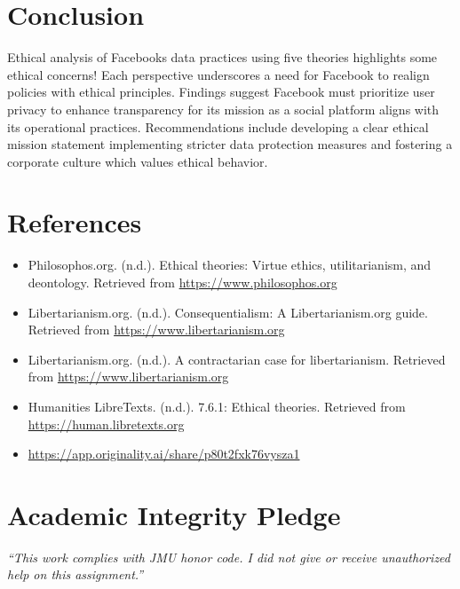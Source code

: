 \documentclass[12pt]{article}
\begin{document}
\section{Conclusion}
Ethical analysis of Facebooks data practices using five theories highlights some ethical concerns! Each perspective underscores a need for Facebook to realign policies with ethical principles. Findings suggest Facebook must prioritize user privacy to enhance transparency for its mission as a social platform aligns with its operational practices. Recommendations include developing a clear ethical mission statement implementing stricter data protection measures and fostering a corporate culture which values ethical behavior.

\section*{References}

\begin{itemize}
    \item Philosophos.org. (n.d.). Ethical theories: Virtue ethics, utilitarianism, and deontology. Retrieved from \url{https://www.philosophos.org}
    
    \item Libertarianism.org. (n.d.). Consequentialism: A Libertarianism.org guide. Retrieved from \url{https://www.libertarianism.org}
    
    \item Libertarianism.org. (n.d.). A contractarian case for libertarianism. Retrieved from \url{https://www.libertarianism.org}
    
    \item Humanities LibreTexts. (n.d.). 7.6.1: Ethical theories. Retrieved from \url{https://human.libretexts.org}

    \item \url{https://app.originality.ai/share/p80t2fxk76vysza1}
\end{itemize}


\vfill
\section*{Academic Integrity Pledge}
{\color{red}\textit{“This work complies with JMU honor code. I did not give or receive unauthorized help on this assignment.”}}
\end{document}
